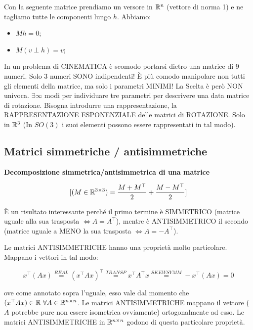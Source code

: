 Con la seguente matrice prendiamo un versore in $\mathbb{R}^n$ (vettore di norma 1) e ne tagliamo tutte le componenti lungo $h$. Abbiamo:

\begin{itemize}

\item $Mh = 0$;
\item $M(v\perp h) = v$;

\end{itemize}

In un problema di CINEMATICA è scomodo portarsi dietro una matrice di 9 numeri. Solo 3 numeri SONO indipendenti! \`E più comodo manipolare non tutti gli elementi della matrice, ma solo i parametri MINIMI! La Scelta è però NON univoca. $\exists\infty$ modi per individuare tre parametri per descrivere una data matrice di rotazione. Bisogna introdurre una rappresentazione, la RAPPRESENTAZIONE ESPONENZIALE delle matrici di ROTAZIONE. Solo in $\mathbb{R}^3$ (In $SO(3)$ i suoi elementi possono essere rappresentati in tal modo).

\subsection{Matrici simmetriche / antisimmetriche} 

\begin{thrm}{\textbf{Decomposizione simmetrica/antisimmetrica di una matrice}}

\[
	[(M\in\mathbb{R}^{3\times 3}) = \frac{M+M^\top}{2} + \frac{M-M^\top}{2}]
\]

\end{thrm} 

\`E un risultato interessante perché il primo termine è SIMMETRICO (matrice uguale alla sua trasposta $\iff A=A^\top$), mentre è ANTISIMMETRICO il secondo (matrice uguale a MENO la sua trasposta $\iff A=-A^\top$).

Le matrici ANTISIMMETRICHE hanno una proprietà molto particolare. Mappano i vettori in tal modo:

\[
	x^\top (Ax) \stackrel{REAL}{=} (x^\top Ax)^\top \stackrel{TRANSP}{=} x^\top A^\top x \stackrel{SKEWSYMM}{=} -x^\top(Ax) = 0
\]

ove come annotato sopra l'uguale, esso vale dal momento che $(x^\top Ax)\in\mathbb{R}\ \forall A\in\mathbb{R}^{n\times n}$. Le matrici ANTISIMMETRICHE mappano il vettore ($A$ potrebbe pure non essere isometrica ovviamente) ortogonalmente ad esso. Le matrici ANTISIMMETRICHE in $\mathbb{R}^{n\times n}$ godono di questa particolare proprietà.

